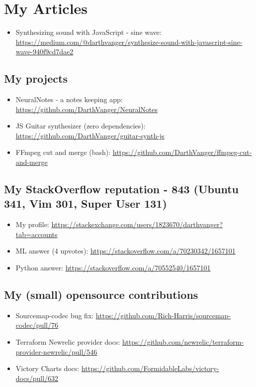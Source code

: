 \documentclass[a4paper, 14pt]{article}
\begin{document}
\section{My Articles}
  \begin{itemize}
    \item Synthesizing sound with JavaScript - sine wave: \url{https://medium.com/@darthvanger/synthesize-sound-with-javascript-sine-wave-940f9cd7dae2}
  \end{itemize}

  \subsection{My projects}
    \begin{itemize}
      \item NeuralNotes - a notes keeping app: \url{https://github.com/DarthVanger/NeuralNotes} \\
      \item JS Guitar synthesizer (zero dependencies): \url{https://github.com/DarthVanger/guitar-synth-js} \\
      \item FFmpeg cut and merge (bash): \url{https://github.com/DarthVanger/ffmpeg-cut-and-merge}
    \end{itemize}

  \subsection{My StackOverflow reputation - 843 (Ubuntu 341, Vim 301, Super User 131)}
    \begin{itemize}
      \item My profile: \url{https://stackexchange.com/users/1823670/darthvanger?tab=accounts} \\
      \item ML answer (4 upvotes): \url{https://stackoverflow.com/a/70230342/1657101} \\
      \item Python answer: \url{https://stackoverflow.com/a/70552540/1657101}
    \end{itemize}

  \subsection{My (small) opensource contributions}
    \begin{itemize}
      \item Sourcemap-codec bug fix: \url{https://github.com/Rich-Harris/sourcemap-codec/pull/76} \\
      \item Terraform Newrelic provider docs: \url{https://github.com/newrelic/terraform-provider-newrelic/pull/546} \\
      \item Victory Charts docs: \url{https://github.com/FormidableLabs/victory-docs/pull/632}
    \end{itemize}
\end{document}
